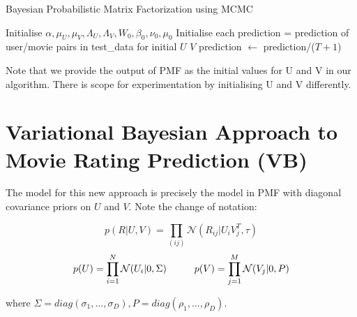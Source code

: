 \documentclass{article}
\theoremstyle{plain}
\begin{document}
\begin{algorithm}
    \SetAlgoNoLine
    \caption{Bayesian Probabilistic Matrix Factorization using MCMC}
        \BlankLine
        Initialise $\alpha,\mu_U,\mu_V,\Lambda_U,\Lambda_V,W_0, \beta_0,\nu_0,\mu_0$ \;
        Initialise each prediction = prediction of user/movie pairs in test\_data for initial $U$ $V$ \;
        prediction $\leftarrow$ prediction/($T+1$) \;
\end{algorithm}

Note that we provide the output of PMF as the initial values for U and V in our algorithm. There is scope for experimentation by initialising U and V differently.

\section{Variational Bayesian Approach to Movie Rating Prediction (VB)}

The model for this new approach is precisely the model in PMF with diagonal covariance priors on $U$ and $V$. Note the change of notation:

\begin{equation}
p(R|U,V)=\prod_{(ij)}\mathcal{N}(R_{ij}|U_i V_j^T,\tau)
\end{equation}
\begin{equation}
p(U)=\prod_{i=1}^N \mathcal{N}(U_i|0,\Sigma) \hspace{10 mm} p(V)=\prod_{j=1}^M \mathcal{N}(V_j|0,P)
\end{equation}

where $\Sigma=diag(\sigma_1,...,\sigma_D), P=diag(\rho_1,...,\rho_D)$.
\end{document}
